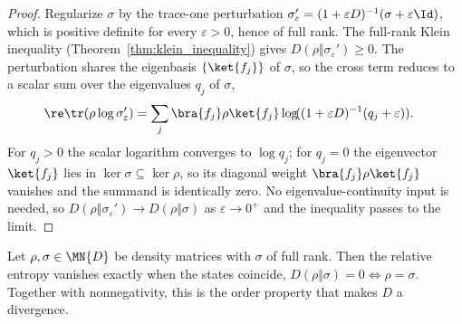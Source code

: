 \begin{proof}\leanok
    Regularize $\sigma$ by the trace-one perturbation
    $\sigma_\varepsilon'=(1+\varepsilon D)^{-1}(\sigma+\varepsilon\Id)$,
    which is positive definite for every $\varepsilon>0$, hence of full rank. The
    full-rank Klein inequality (Theorem~\ref{thm:klein_inequality}) gives
    $D(\rho\Vert\sigma_\varepsilon')\ge0$. The perturbation shares the
    eigenbasis $\{\ket{f_j}\}$ of $\sigma$, so the cross term reduces to a scalar
    sum over the eigenvalues $q_j$ of $\sigma$,
    \begin{align}
        \re\tr(\rho\log\sigma_\varepsilon')
         & =\sum_j\bra{f_j}\rho\ket{f_j}
        \log\!((1+\varepsilon D)^{-1}(q_j+\varepsilon)).
        \notag
    \end{align}
    For $q_j>0$ the scalar logarithm converges to $\log q_j$; for $q_j=0$ the
    eigenvector $\ket{f_j}$ lies in $\ker\sigma\subseteq\ker\rho$, so its diagonal
    weight $\bra{f_j}\rho\ket{f_j}$ vanishes and the summand is identically zero.
    No eigenvalue-continuity input is needed, so
    $D(\rho\Vert\sigma_\varepsilon')\to D(\rho\Vert\sigma)$ as
    $\varepsilon\to0^+$ and the inequality passes to the limit.
\end{proof}

\begin{theorem}
    \label{thm:klein_inequality_equality}
    \leanok
    Let $\rho,\sigma\in\MN{D}$ be density matrices with $\sigma$ of full rank.
    Then the relative entropy vanishes exactly when the states coincide,
    $D(\rho\Vert\sigma)=0\iff\rho=\sigma$.
    Together with nonnegativity, this is the order property that makes $D$ a
    divergence.
\end{theorem}


